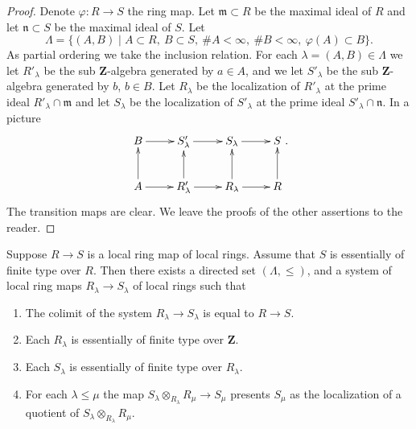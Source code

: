 \begin{proof}
Denote $\varphi : R  \to S$ the ring map.
Let $\mathfrak m \subset R$ be the maximal ideal
of $R$ and let $\mathfrak n \subset S$ be the maximal
ideal of $S$. Let
$$
\Lambda = \{
(A, B)
\mid
A \subset R,\ 
B \subset S,\ 
\# A < \infty,\ 
\# B < \infty,\ 
\varphi(A) \subset B
\}.
$$
As partial ordering we take the inclusion relation. For each
$\lambda = (A, B) \in \Lambda$ we let $R'_\lambda$ be
the sub $\mathbf{Z}$-algebra generated by
$a \in A$, and we let $S'_\lambda$ be the sub
$\mathbf{Z}$-algebra generated by $b$, $b \in B$.
Let $R_\lambda$ be the localization of $R'_\lambda$
at the prime ideal $R'_\lambda \cap \mathfrak m$ and let
$S_\lambda$ be the localization of $S'_\lambda$ at
the prime ideal $S'_\lambda \cap \mathfrak n$.
In a picture
$$
\xymatrix{
B \ar[r] &
S'_\lambda \ar[r] &
S_\lambda \ar[r] &
S \\
A \ar[r] \ar[u] &
R'_\lambda \ar[r] \ar[u] &
R_\lambda \ar[r] \ar[u] &
R \ar[u]
}.
$$
The transition maps are clear. We leave the proofs of the other
assertions to the reader.
\end{proof}

\begin{lemma}
\label{lemma-limit-essentially-finite-type}
Suppose $R \to S$ is a local ring map of local rings.
Assume that $S$ is essentially of finite type over $R$.
Then there exists a directed set $(\Lambda, \leq)$, and
a system of local ring maps $R_\lambda \to S_\lambda$
of local rings such that
\begin{enumerate}
\item The colimit of the system $R_\lambda \to S_\lambda$
is equal to $R \to S$.
\item Each $R_\lambda$ is essentially of finite type
over $\mathbf{Z}$.
\item Each $S_\lambda$ is essentially of finite type
over $R_\lambda$.
\item For each $\lambda \leq \mu$ the map
$S_\lambda \otimes_{R_\lambda} R_\mu \to S_\mu$
presents $S_\mu$ as the localization of a quotient
of $S_\lambda \otimes_{R_\lambda} R_\mu$.
\end{enumerate}
\end{lemma}

